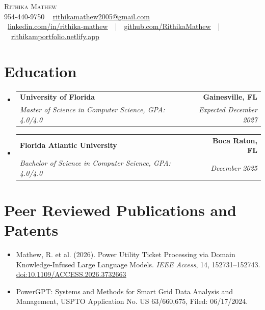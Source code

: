 \documentclass[letterpaper,10pt]{article}
\makeatletter
\newcommand{\resumeItem}[1]{
  \item\small{{#1 \vspace{-2pt}}}
}
\newcommand{\resumeSubheading}[4]{
  \Needspace{5\baselineskip}
  \vspace{-1pt}\item
    \begin{tabular*}{1.0\textwidth}[t]{l@{\extracolsep{\fill}}r}
      \textbf{#1} & \textbf{\small #2} \\
      \textit{\small#3} & \textit{\small #4} \\
    \end{tabular*}\vspace{-6pt}
}
\newcommand{\resumeSubHeadingListStart}{\begin{itemize}[leftmargin=0.0in, label={}, topsep=1pt, partopsep=0pt, itemsep=0pt]}
\newcommand{\resumeSubHeadingListEnd}{\end{itemize}}
\makeatother
\begin{document}
\begin{center}
    {\Huge \scshape Rithika Mathew} \\ \vspace{2pt}
    \small 954-440-9750 ~
    \href{mailto:rithikamathew2005@gmail.com}{\underline{rithikamathew2005@gmail.com}} \\
    \vspace{1pt}
    {\footnotesize
    \mbox{%
    \href{https://www.linkedin.com/in/rithika-mathew}{\underline{linkedin.com/in/rithika-mathew}} ~|~
    \href{https://github.com/RithikaMathew}{\underline{github.com/RithikaMathew}} ~|~
    \href{https://rithikamportfolio.netlify.app/}{\underline{rithikamportfolio.netlify.app}}%
    }}
    \vspace{-6pt}
\end{center}

\section{Education}
  \resumeSubHeadingListStart
    \resumeSubheading
      {University of Florida}{Gainesville, FL}
      {Master of Science in Computer Science, GPA: 4.0/4.0}{Expected December 2027}
    \resumeSubheading
      {Florida Atlantic University}{Boca Raton, FL}
      {Bachelor of Science in Computer Science, GPA: 4.0/4.0}{December 2025}
  \resumeSubHeadingListEnd

\section{Peer Reviewed Publications and Patents}
  \resumeSubHeadingListStart
    \resumeItem{Mathew, R. et al. (2026). Power Utility Ticket Processing via Domain Knowledge-Infused Large Language Models. \textit{IEEE Access}, 14, 152731--152743. \href{https://doi.org/10.1109/ACCESS.2026.3732663}{\underline{doi:10.1109/ACCESS.2026.3732663}}}
    \resumeItem{PowerGPT: Systems and Methods for Smart Grid Data Analysis and Management, USPTO Application No. US 63/660,675, Filed: 06/17/2024.}
  \resumeSubHeadingListEnd

\end{document}
